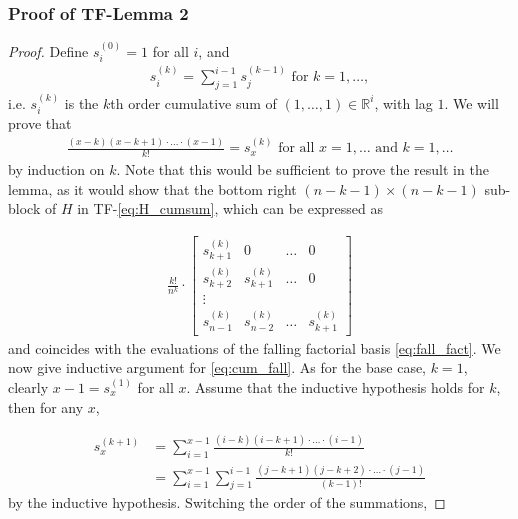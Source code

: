 \documentclass[a4paper]{article}
\newcommand{\RR}{\mathbb{R}}
\begin{document}
\subsubsection{Proof of TF-Lemma 2}
\begin{proof}
Define $s_i^{(0)} = 1$ for all $i$, and 
\begin{align*}
s_i^{(k)} = \sum_{j=1}^{i-1}s_j^{(k-1)} \text{ for } k = 1,\ldots, 
\end{align*}
i.e. $s_i^{(k)}$ is the $k$th order cumulative sum of $(1,\ldots, 1)\in\RR^i$, with lag $1$. We will prove that
\begin{align}
\frac{(x-k)(x-k+1)\cdot\ldots\cdot (x-1)}{k!} = s_x^{(k)} \text{ for all } x = 1,\ldots \text{ and } k = 1,\ldots
\label{eq:cum_fall}
\end{align}
by induction on $k$. Note that this would be sufficient to prove the result in the lemma, as it would show that the bottom right $(n-k-1)\times (n-k-1)$ sub-block of $H$ in TF-\eqref{eq:H_cumsum}, which can be expressed as

\begin{align*}
\frac{k!}{n^k}\cdot
\begin{bmatrix}
s_{k+1}^{(k)} & 0 & \ldots & 0\\
s_{k+2}^{(k)} & s_{k+1}^{(k)} & \ldots & 0\\
\vdots\\
s_{n-1}^{(k)} & s_{n-2}^{(k)} & \ldots & s_{k+1}^{(k)}
\end{bmatrix}
\end{align*}
and coincides with the evaluations of the falling factorial basis \eqref{eq:fall_fact}. We now give inductive argument for \eqref{eq:cum_fall}. As for the base case, $k = 1$, clearly $x - 1=s_x^{(1)}$ for all $x$. Assume that the inductive hypothesis holds for $k$, then for any $x$,

\begin{align*}
s_x^{(k+1)} &= \sum_{i=1}^{x-1}\frac{(i-k)(i-k+1)\cdot\ldots\cdot(i-1)}{k!}\\
&= \sum_{i=1}^{x-1}\sum_{j=1}^{i-1}\frac{(j-k+1)(j-k+2)\cdot\ldots\cdot(j-1)}{(k-1)!}
\end{align*}
by the inductive hypothesis. Switching the order of the summations, 


\end{proof}
\end{document}
